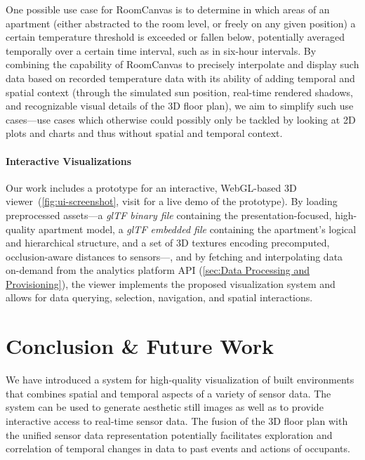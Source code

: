 \documentclass{egpubl}
\begin{document}
One possible use case for RoomCanvas is to determine in which areas of an apartment (either abstracted to the room level, or freely on any given position) a certain temperature threshold is exceeded or fallen below, potentially averaged temporally over a certain time interval, such as in six-hour intervals. 
By combining the capability of RoomCanvas to precisely interpolate and display such data based on recorded temperature data with its ability of adding temporal and spatial context (through the simulated sun position, real-time rendered shadows, and recognizable visual details of the 3D floor plan), we aim to simplify such use cases---use cases which otherwise could possibly only be tackled by looking at 2D plots and charts and thus without spatial and temporal context.

\paragraph*{Interactive Visualizations}

Our work includes a prototype for an interactive, WebGL-based 3D viewer~(\autoref{fig:ui-screenshot}, visit  for a live demo of the prototype). 
By loading preprocessed assets---a \emph{glTF binary file} containing the presentation-focused, high-quality apartment model, a \emph{glTF embedded file} containing the apartment’s logical and hierarchical structure, and a set of 3D textures encoding precomputed, occlusion-aware distances to sensors---, and by fetching and interpolating data on-demand from the analytics platform API (\autoref{sec:Data Processing and Provisioning}), the viewer implements the proposed visualization system and allows for data querying, selection, navigation, and spatial interactions.

\section{Conclusion \& Future Work}

We have introduced a system for high-quality visualization of built environments that combines spatial and temporal aspects of a variety of sensor data. 
The system can be used to generate aesthetic still images as well as to provide interactive access to real-time sensor data.
The fusion of the 3D floor plan with the unified sensor data representation potentially facilitates exploration and correlation of temporal changes in data to past events and actions of occupants.
\end{document}
